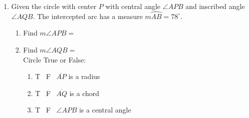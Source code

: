 \begin{enumerate}
\item Given the circle with center $P$ with central angle $\angle APB$ and inscribed angle $\angle AQB$. The intercepted arc has a measure $m \wideparen{AB}=78^\circ$.
  \begin{multicols}{2}
    \raggedcolumns
    \begin{enumerate}
      \item Find $m\angle APB=$ \vspace{0.7cm}
      \item Find $m\angle AQB=$ \vspace{0.7cm}\\
      Circle True or False:
      \begin{enumerate}[itemsep=0.3cm]
        \item T \, F \, $\overline{AP}$ is a radius
        \item T \, F \, $\overline{AQ}$ is a chord
        \item T \, F \, $\angle APB$ is a central angle
      \end{enumerate}
    \end{enumerate}
  \end{multicols} \vspace{0.25cm}

\end{enumerate}

